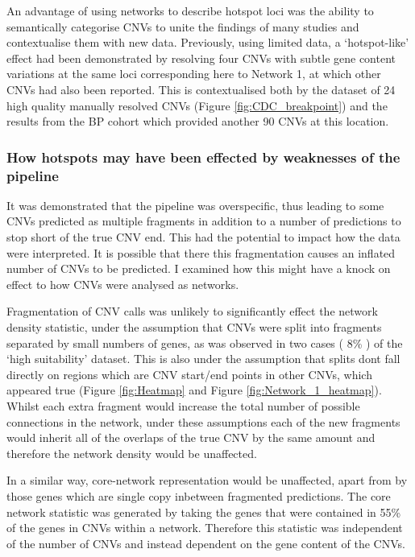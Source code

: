 \documentclass{article}
\begin{document}
An advantage of using networks to describe hotspot loci was the ability to semantically categorise CNVs to unite the findings of many studies and contextualise them with new data. Previously, using limited data, a ‘hotspot-like’ effect had been demonstrated by resolving four CNVs with subtle gene content variations at the same loci corresponding here to Network 1, at which other CNVs had also been reported. This is contextualised both by the dataset of 24 high quality manually resolved CNVs (Figure  \ref{fig:CDC_breakpoint}) and the results from the BP cohort which provided another 90 CNVs at this location.




\subsubsection{How hotspots may have been effected by weaknesses of the pipeline}

It was demonstrated that the pipeline was overspecific, thus leading to some CNVs predicted as multiple fragments in addition to a number of predictions to stop short of the true CNV end. This had the potential to impact how the data were interpreted.  It is possible that there this fragmentation causes an inflated number of CNVs to be predicted. I examined how this might have a knock on effect to how CNVs were analysed as networks.



Fragmentation of CNV calls was unlikely to significantly effect the network density statistic, under the assumption that CNVs were split into fragments separated by small numbers of genes, as was observed in two cases ( 8\% ) of the `high suitability' dataset. This is also under the assumption that splits dont fall directly on regions which are CNV start/end points in other CNVs, which appeared true (Figure \ref{fig:Heatmap} and Figure  \ref{fig:Network_1_heatmap}). Whilst each extra fragment would increase the total number of possible connections in the network, under these assumptions each of the new fragments would inherit all of the overlaps of the true CNV by the same amount and therefore the network density would be unaffected.

In a similar way, core-network representation would be unaffected, apart from by those genes which are single copy inbetween fragmented predictions. The core network statistic was generated by taking the genes that were contained in 55\% of the genes in CNVs within a network. Therefore this statistic was independent of the number of CNVs and instead dependent on the gene content of the CNVs.
\end{document}
